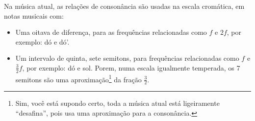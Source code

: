 Na música atual, as relações de consonância são usadas na escala cromática, 
em notas musicais com:
\begin{itemize} 
\item Uma oitava de diferença, para as frequências relacionadas como $f$ e $2f$, 
por exemplo: dó e dó'.
\item Um intervalo de quinta, sete semitons, para frequências relacionadas como  $f$ e $\frac{3}{2}f$, 
por exemplo: dó e sol. Porem, numa escala igualmente temperada, 
os 7 semitons são uma aproximação\footnote{Sim, você está supondo certo,
toda a música atual está ligeiramente ``desafina'', pois usa uma aproximação para a consonância.}
 da fração $\frac{3}{2}$.
\end{itemize}

